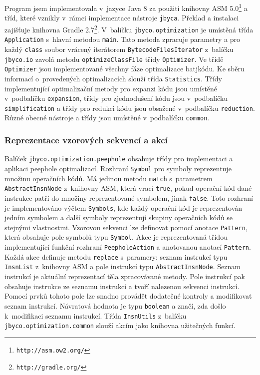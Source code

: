 Program jsem implementovala v~jazyce Java 8 za použití knihovny ASM 5.0\footnote{\texttt{http://asm.ow2.org/}} a tříd, které vznikly v~rámci implementace nástroje \texttt{jbyca}. Překlad a instalaci zajišťuje knihovna Gradle 2.7\footnote{\texttt{http://gradle.org/}}. V~balíčku \texttt{jbyco.optimization} je umístěná třída \texttt{Application} s~hlavní metodou \texttt{main}. Tato metoda zpracuje parametry a pro každý \texttt{class} soubor vrácený iterátorem \texttt{BytecodeFilesIterator} z~balíčku \texttt{jbyco.io} zavolá metodu \texttt{optimizeClassFile} třídy \texttt{Optimizer}. Ve třídě \texttt{Optimizer} jsou implementované všechny fáze optimalizace batjkódu. Ke sběru informací o~provedených optimalizacích slouží třída \texttt{Statistics}. Třídy implementující optimalizační metody pro expanzi kódu jsou umístěné v~podbalíčku \texttt{expansion}, třídy pro zjednodušení kódu jsou v~podbalíčku \texttt{simplification} a třídy pro redukci kódu jsou obsažené v~podbalíčku \texttt{reduction}. Různé obecné nástroje a třídy jsou umístěné v~podbalíčku \texttt{common}.

\subsubsection{Reprezentace vzorových sekvencí a akcí}

Balíček \texttt{jbyco.optimization.peephole} obsahuje třídy pro implementaci a aplikaci peephole optimalizací. Rozhraní \texttt{Symbol} pro symboly reprezentuje množinu operačních kódů. Má jedinou metodu \texttt{match} s~parametrem \texttt{AbstractInsnNode} z~knihovny ASM, která vrací \texttt{true}, pokud operační kód dané instrukce patří do množiny reprezentované symbolem, jinak \texttt{false}. Toto rozhraní je implementováno výčtem \texttt{Symbols}, kde každý operační kód je reprezentován jedním symbolem a další symboly reprezentují skupiny operačních kódů se stejnými vlastnostmi. Vzorovou sekvenci lze definovat pomocí anotace \texttt{Pattern}, která obsahuje pole symbolů typu \texttt{Symbol}. Akce je reprezentovaná třídou implementující funkční rozhraní \texttt{PeepholeAction} a anotovanou anotací \texttt{Pattern}. Každá akce definuje metodu \texttt{replace} s~paramery: seznam instrukcí typu \texttt{InsnList} z~knihovny ASM a pole instrukcí typu \texttt{AbstractInsnNode}. Seznam instrukcí je aktuální reprezentací těla zpracovávané metody. Pole instrukcí pak obsahuje instrukce ze seznamu instrukcí a tvoří nalezenou sekvenci instrukcí. Pomocí prvků tohoto pole lze snadno provádět dodatečné kontroly a modifikovat seznam instrukcí. Návratová hodnota je typu \texttt{boolean} a značí, zda došlo k~modifikaci seznamu instrukcí. Třída \texttt{InsnUtils} z~balíčku \texttt{jbyco.optimization.common} slouží akcím jako knihovna užitečných funkcí.

